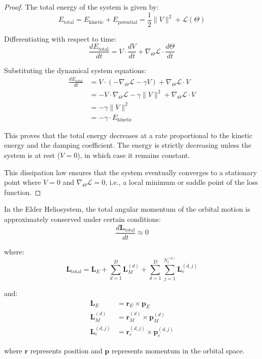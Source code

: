 \begin{proof}
The total energy of the system is given by:
\begin{equation}
E_{\text{total}} = E_{\text{kinetic}} + E_{\text{potential}} = \frac{1}{2}\|V\|^2 + \mathcal{L}(\Theta)
\end{equation}

Differentiating with respect to time:
\begin{equation}
\frac{dE_{\text{total}}}{dt} = V \cdot \frac{dV}{dt} + \nabla_{\Theta} \mathcal{L} \cdot \frac{d\Theta}{dt}
\end{equation}

Substituting the dynamical system equations:
\begin{align}
\frac{dE_{\text{total}}}{dt} &= V \cdot (-\nabla_{\Theta} \mathcal{L} - \gamma V) + \nabla_{\Theta} \mathcal{L} \cdot V \\
&= -V \cdot \nabla_{\Theta} \mathcal{L} - \gamma \|V\|^2 + \nabla_{\Theta} \mathcal{L} \cdot V \\
&= -\gamma \|V\|^2 \\
&= -\gamma \cdot E_{\text{kinetic}}
\end{align}

This proves that the total energy decreases at a rate proportional to the kinetic energy and the damping coefficient. The energy is strictly decreasing unless the system is at rest ($V = 0$), in which case it remains constant.

This dissipation law ensures that the system eventually converges to a stationary point where $V = 0$ and $\nabla_{\Theta} \mathcal{L} = 0$, i.e., a local minimum or saddle point of the loss function.
\end{proof}

\begin{theorem}
In the Elder Heliosystem, the total angular momentum of the orbital motion is approximately conserved under certain conditions:
\begin{equation}
\frac{d\mathbf{L}_{\text{total}}}{dt} \approx 0
\end{equation}

where:
\begin{equation}
\mathbf{L}_{\text{total}} = \mathbf{L}_E + \sum_{d=1}^D \mathbf{L}_M^{(d)} + \sum_{d=1}^D \sum_{j=1}^{N_e^{(d)}} \mathbf{L}_e^{(d,j)}
\end{equation}

and:
\begin{align}
\mathbf{L}_E &= \mathbf{r}_E \times \mathbf{p}_E \\
\mathbf{L}_M^{(d)} &= \mathbf{r}_M^{(d)} \times \mathbf{p}_M^{(d)} \\
\mathbf{L}_e^{(d,j)} &= \mathbf{r}_e^{(d,j)} \times \mathbf{p}_e^{(d,j)}
\end{align}

where $\mathbf{r}$ represents position and $\mathbf{p}$ represents momentum in the orbital space.
\end{theorem}

